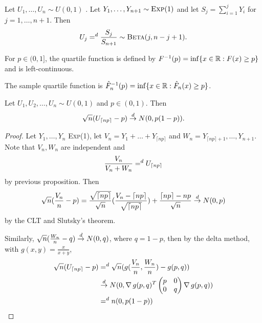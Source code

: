 \begin{proposition}
  Let $U_{1}, \dots, U_{n} \sim U(0, 1)$ \iid.  Let $Y_{1}, \dots,
  Y_{n+1} \sim \textsc{Exp}(1)$ \iid and let $S_{j} = \sum_{i=1}^{j}
  Y_{i}$ for $j = 1, \dots, n+1$.  Then
  \begin{align}
    \label{eq:13}
    U_{j} =^{d} \frac{S_{j}}{S_{n+1}} \sim \textsc{Beta}(j, n-j+1).
  \end{align}
\end{proposition}

\begin{defn}
  \label{sec:let-x_1-dots}
  For $p \in (0, 1]$, the quartile function is defined by $F^{-1}(p) =
  \inf \{x \in \mathbb{R}: F(x) \geq p \}$ and is left-continuous.

  The sample quartile function is $\hat F_{n}^{-1}(p) = \inf \{ x \in
  \mathbb{R}: \hat F_{n}(x) \geq p \} $. 
\end{defn}

\begin{thm}
  Let $U_{1}, U_{2}, \dots, U_{n} \sim U(0, 1)$ \iid and $p \in (0,
  1)$.  Then
  \begin{equation}
    \label{eq:135}
    \sqrt{n}(U_{\lceil np \rceil} - p) \overset{d}{\rightarrow} N(0, p(1-p)).
  \end{equation}
\end{thm}

\begin{proof}
  Let $Y_{1}, \dots, Y_{n}$ \iid \textsc{Exp}(1), let $V_{n} = Y_{1} + \dots +
  Y_{\lceil np \rceil}$ and $W_{n} = Y_{\lceil np \rceil + 1}, \dots,
  Y_{n+1}$.  Note that $V_{n}, W_{n}$ are independent and
  \begin{equation}
    \label{eq:136}
    \frac{V_{n}}{V_{n} + W_{n}} =^{d} U_{\upperbound{np}}
  \end{equation} by previous proposition.
  Then
  \begin{align}
    \label{eq:137}
    \sqrt{n}(\frac{V_{n}}{n} - p) =
    \frac{\sqrt{\upperbound{np}}}{\sqrt{n}} (\frac{V_{n} -
      \upperbound{np}}{\sqrt{\upperbound{np}}} ) +
    \frac{\upperbound{np} - np}{\sqrt{n}} \cd N(0, p)
  \end{align} by the CLT and Slutsky's theorem.

  Similarly, $\sqrt{n}(\frac{W_{n}}{n} - q) \overset{d}{\rightarrow} N(0, q)$, where $q = 1
  - p$, then by the delta method, with $g(x, y) = \frac{x}{x+y}$,
  \begin{align}
    \label{eq:138}
    \sqrt{n}(U_{\upperbound{np}} - p) &=^{d}
    \sqrt{n}(g(\frac{V_{n}}{n}, \frac{W_{n}}{n}) - g(p, q)) \\
    &\cd N(0, \grad g(p, q)^{T}
    \begin{pmatrix}
      p & 0 \\
      0 & q
    \end{pmatrix} \grad g(p, q)) \\
    \label{eq:140}
    &=^{d} n(0, p(1-p))
  \end{align}
\end{proof}

